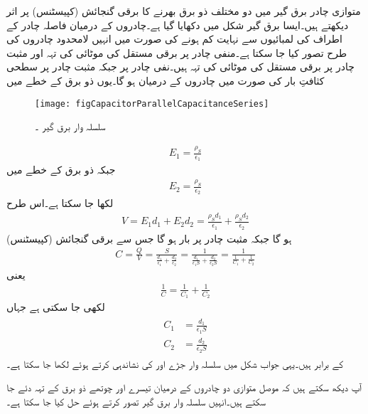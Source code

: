 متوازی چادر برق گیر میں دو مختلف ذو برق بھرنے کا برقی گنجائش (کپیسٹنس) پر اثر دیکھتے ہیں۔ایسا برق گیر شکل  میں دکھایا گیا ہے۔چادروں کے درمیان فاصلہ چادر کے اطراف کی لمبائیوں سے نہایت کم ہونے کی صورت میں انہیں لامحدود چادروں کی طرح تصور کیا جا سکتا ہے۔منفی چادر پر  برقی مستقل کی  موٹائی کی تہہ  اور مثبت چادر پر  برقی مستقل کی  موٹائی کی تہہ ہیں۔نفی چادر پر  جبکہ مثبت چادر پر  سطحی کثافتِ بار کی صورت میں چادروں کے درمیان  ہو گا۔یوں  ذو برق کے خطے میں
\begin{figure}[!ht]
\centering
\texttt{[image: figCapacitorParallelCapacitanceSeries]}
\caption{سلسلہ وار برق گیر ۔}
\label{شکل_کپیسٹر_سلسلہ_وار}
\end{figure}
%
\begin{align*}
E_1=\frac{\rho_S}{\epsilon_1}
\end{align*}
جبکہ  ذو برق کے خطے میں
\begin{align*}
E_2=\frac{\rho_S}{\epsilon_2}
\end{align*}
لکھا جا سکتا ہے۔اس طرح 
\begin{align*}
V=E_1 d_1+E_2 d_2=\frac{\rho_S d_1}{\epsilon_1}+\frac{\rho_S d_2}{\epsilon_2}
\end{align*}
ہو گا جبکہ مثبت چادر پر بار  ہو گا جس سے برقی گنجائش (کپیسٹنس)
\begin{align*}
C=\frac{Q}{V}=\frac{S}{\frac{d_1}{\epsilon_1}+\frac{d_2}{\epsilon_2}}=\frac{1}{\frac{d_1}{\epsilon_1 S }+\frac{d_2}{\epsilon_2 S }}=\frac{1}{\frac{1}{C_1}+\frac{1}{C_2}}
\end{align*}
یعنی
\begin{align}
\frac{1}{C}=\frac{1}{C_1}+\frac{1}{C_2}
\end{align}
لکھی جا سکتی ہے جہاں
\begin{gather}
\begin{aligned}
C_1&=\frac{d_1}{\epsilon_1 S}\\
C_2&=\frac{d_2}{\epsilon_2 S}
\end{aligned}
\end{gather}
کے برابر ہیں۔یہی جواب شکل  میں سلسلہ وار جڑے   اور  کی نشاندہی کرتے ہوئے لکھا جا سکتا ہے۔

آپ دیکھ سکتے ہیں کہ موصل متوازی دو چادروں کے درمیان تیسرے اور چوتھے ذو برق کے تہہ دئے جا سکتے ہیں۔انہیں سلسلہ وار برق گیر تصور کرتے ہوئے حل کیا جا سکتا ہے۔

